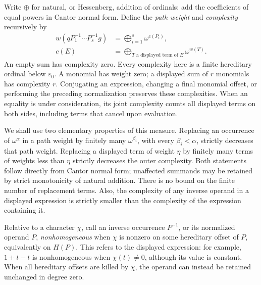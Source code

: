 Write \(\oplus\) for natural, or Hessenberg, addition of ordinals:
add the coefficients of equal powers in Cantor normal form. Define the
\emph{path weight} and \emph{complexity} recursively by
\begin{align}
 w(qP_1^{-1}\cdots P_s^{-1}g)
   &=\bigoplus_{i=1}^s\omega^{c(P_i)},\label{coeff:path-weight}\\
 c(E)&=\bigoplus_{T\text{ a displayed term of }E}\omega^{w(T)}.
 \label{coeff:complexity}
\end{align}
An empty sum has complexity zero. Every complexity here is a finite
hereditary ordinal below \(\varepsilon_0\). A monomial has weight zero;
a displayed sum of \(r\) monomials has complexity \(r\). Conjugating an
expression, changing a final monomial offset, or performing the preceding
normalization preserves these complexities. When an equality is under
consideration, its joint complexity counts all displayed terms on both
sides, including terms that cancel upon evaluation.

We shall use two elementary properties of this measure. Replacing an
occurrence of \(\omega^\alpha\) in a path weight by finitely many
\(\omega^{\beta_i}\), with every \(\beta_i<\alpha\), strictly decreases
that path weight. Replacing a displayed term of weight \(\eta\) by
finitely many terms of weights less than \(\eta\) strictly decreases
the outer complexity. Both statements follow directly from Cantor
normal form; unaffected summands may be retained by strict monotonicity
of natural addition. There is no bound on the finite number of replacement
terms. Also, the complexity of any inverse operand in a displayed
expression is strictly smaller than the complexity of the expression
containing it.

Relative to a character \(\chi\), call an inverse occurrence
\(P^{-1}\), or its normalized operand \(P\), \emph{nonhomogeneous}
when \(\chi\) is nonzero on some hereditary offset of \(P\),
equivalently on \(H(P)\). This refers to the displayed expression:
for example, \(1+t-t\) is nonhomogeneous when \(\chi(t)\ne0\),
although its value is constant. When all hereditary offsets are
killed by \(\chi\), the operand can instead be retained unchanged
in degree zero.

